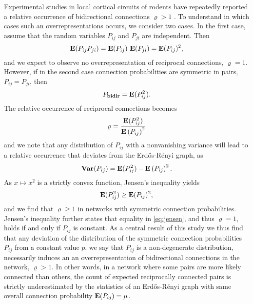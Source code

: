 Experimental studies in local cortical circuits of rodents have repeatedly reported a relative occurrence of bidirectional connections $\varrho > 1$ \cite{Markram1997, Song2005, Perin2011}. To understand in which cases such an overrepresentations occurs, we consider two cases. In the first case, assume that the random variables $P_{ij}$ and $P_{ji}$ are independent. Then
\begin{align}
\operatorname{\mathbf{E}}(P_{ij} P_{ji}) = \operatorname{\mathbf{E}}(P_{ij})\,\operatorname{\mathbf{E}}(P_{ji}) = \operatorname{\mathbf{E}}(P_{ij})^2,
\end{align}
and we expect to observe no overrepresentation of reciprocal connections, $\varrho = 1$. However, if in the second case connection probabilities are symmetric in pairs, $P_{ij} = P_{ji}$, then 
\begin{align}
P_{\mathbf{bidir}} = \operatorname{\mathbf{E}}(P_{ij}^2).
\end{align}
%
The relative occurrence of reciprocal connections becomes
\begin{align}
\varrho = \frac{\operatorname{\mathbf{E}}(P_{ij}^2)}{{\operatorname{\mathbf{E}}\left(P_{ij}\right)}^2}
\end{align}
and we note that any distribution of $P_{ij}$ with a nonvanishing variance will lead to a relative occurrence that deviates from the Erd\H{o}s-R\'{e}nyi graph, as
\begin{align}
\operatorname{\mathbf{Var}}(P_{ij}) = \operatorname{\mathbf{E}}(P_{ij}^2) - \operatorname{\mathbf{E}}\left(P_{ij}\right)^2.
\end{align}
As $x \mapsto x^2$ is a strictly convex function, Jensen's inequality \cite{Jensen1906, Cover2006} yields
\begin{align}
\operatorname{\mathbf{E}}(P_{ij}^2) \geq \operatorname{\mathbf{E}}(P_{ij})^2, \label{eq:jensen}
\end{align}
and we find that $\varrho \geq 1$ in networks with symmetric connection probabilities. Jensen's inequality further states that equality in \eqref{eq:jensen}, and thus $\varrho = 1$, holds if and only if $P_{ij}$ is constant. As a central result of this study we thus find that any deviation of the distribution of the symmetric connection probabilities $P_{ij}$ from a constant value $p$, we say that $P_{ij}$ is a non-degenerate distribution, necessarily induces an an overrepresentation of bidirectional connections in the network, $\varrho > 1$. In other words, in a network where some pairs are more likely connected than others, the count of expected reciprocally connected pairs is strictly underestimated by the statistics of an Erd\H{o}s-R\'{e}nyi graph with same overall connection probability $\operatorname{\mathbf{E}}(P_{ij}) = \mu$.






